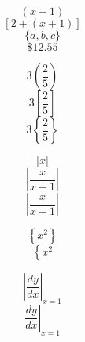 \documentclass[11pt]{article}
\begin{document}
$$(x+1)$$
$$[2+(x+1)]$$
$$\{a,b,c\}$$
$$\$12.55$$

$$3\left(\frac{2}{5}\right)$$
$$3\left[\frac{2}{5}\right]$$
$$3\left\{\frac{2}{5}\right\}$$

$$|x|$$
$$|\frac{x}{x+1}|$$
$$\left|\frac{x}{x+1}\right|$$

$$\left\{x^2\right\}$$
$$\left\{x^2\right.$$

$$\left| \frac{dy}{dx} \right|_{x=1}$$
$$\left. \frac{dy}{dx} \right|_{x=1}$$
\end{document}
